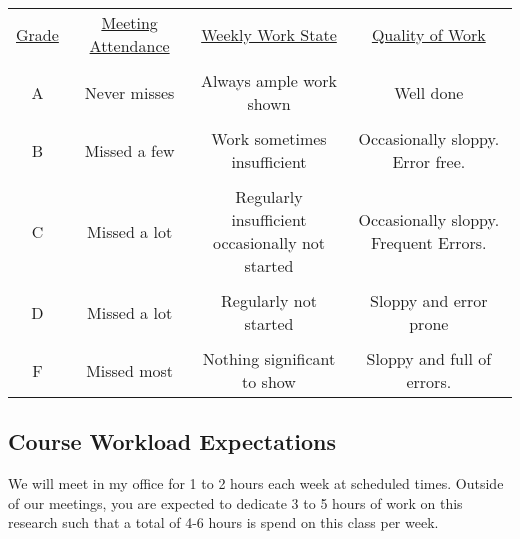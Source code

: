 \documentclass[10pt]{article}
\begin{document}
\begin{tabular}{cccc}
\underline{Grade}  & \underline{Meeting Attendance} &  \underline{Weekly Work State} & \underline{Quality of Work} \\ \\
A &  Never misses & Always ample work shown & Well done \\ \\
B &  Missed a few & Work sometimes insufficient & Occasionally sloppy. Error free.  \\ \\
C &  Missed a lot & \makecell{Regularly insufficient \\ occasionally not started} & \makecell{Occasionally sloppy. \\Frequent Errors.} \\ \\
D &  Missed a lot & Regularly not started & Sloppy and error prone \\ \\
F & Missed most & Nothing significant to show & Sloppy and full of errors. \\
\end{tabular}

\subsection{Course Workload Expectations}

We will meet in my office for 1 to 2 hours each week at scheduled times. Outside of our meetings, you are expected to dedicate 3 to 5 hours of work on this research such that a total of 4-6 hours is spend on this class per week.
\end{document}
